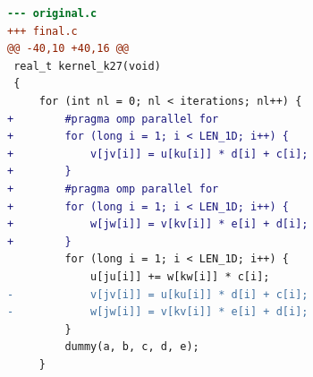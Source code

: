 \begin{lstlisting}[language=diff,basicstyle=\ttfamily\scriptsize,breaklines=true,caption={tsvc_c2/k27 — FASTER (e2v6_agent_2)}]
--- original.c
+++ final.c
@@ -40,10 +40,16 @@
 real_t kernel_k27(void)
 {
     for (int nl = 0; nl < iterations; nl++) {
+        #pragma omp parallel for 
+        for (long i = 1; i < LEN_1D; i++) {
+            v[jv[i]] = u[ku[i]] * d[i] + c[i];
+        }
+        #pragma omp parallel for 
+        for (long i = 1; i < LEN_1D; i++) {
+            w[jw[i]] = v[kv[i]] * e[i] + d[i];
+        }
         for (long i = 1; i < LEN_1D; i++) {
             u[ju[i]] += w[kw[i]] * c[i];
-            v[jv[i]] = u[ku[i]] * d[i] + c[i];
-            w[jw[i]] = v[kv[i]] * e[i] + d[i];
         }
         dummy(a, b, c, d, e);
     }
\end{lstlisting}
